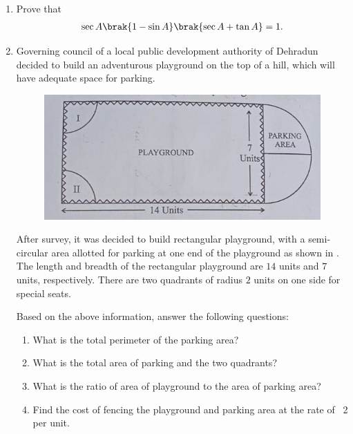 \begin{enumerate}
    \item Prove that 
    \begin{align}
        \sec A\brak{1-\sin A}\brak{\sec A+\tan A}=1.
    \end{align}

    \item Governing council of a local public development authority of Dehradun decided to build an adventurous playground on the top of a hill, which will have adequate space for parking.
    
    \begin{figure}[!ht]
    \centering
    \includegraphics[width=\columnwidth]{figs/fig.png}
    \caption{}
    \label{fig:figure1}
\end{figure}
After survey, it was decided to build rectangular playground, with a semi-circular area allotted for parking at one end of the playground as shown in . The length and breadth of the rectangular playground are $14$ units and $7$ units, respectively. There are two quadrants of radius $2$ units on one side for special seats.

Based on the above information, answer the following questions:
\begin{enumerate}
    \item What is the total perimeter of the parking area?
    \item What is the total area of parking and the two quadrants?
    \item What is the ratio of area of playground to the area of parking area?
    \item Find the cost of fencing the playground and parking area at the rate of \rupee~2 per unit.
\end{enumerate}
    \end{enumerate}
%
